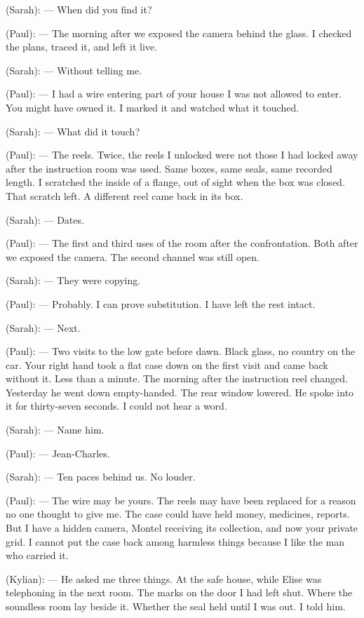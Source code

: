 \begin{room}
(Sarah): --- When did you find it?

(Paul): --- The morning after we exposed the camera behind the glass. I checked the plans, traced it, and left it live.

(Sarah): --- Without telling me.

(Paul): --- I had a wire entering part of your house I was not allowed to enter. You might have owned it. I marked it and watched what it touched.

(Sarah): --- What did it touch?

(Paul): --- The reels. Twice, the reels I unlocked were not those I had locked away after the instruction room was used. Same boxes, same seals, same recorded length. I scratched the inside of a flange, out of sight when the box was closed. That scratch left. A different reel came back in its box.

(Sarah): --- Dates.

(Paul): --- The first and third uses of the room after the confrontation. Both after we exposed the camera. The second channel was still open.

(Sarah): --- They were copying.

(Paul): --- Probably. I can prove substitution. I have left the rest intact.

(Sarah): --- Next.

(Paul): --- Two visits to the low gate before dawn. Black glass, no country on the car. Your right hand took a flat case down on the first visit and came back without it. Less than a minute. The morning after the instruction reel changed. Yesterday he went down empty-handed. The rear window lowered. He spoke into it for thirty-seven seconds. I could not hear a word.

(Sarah): --- Name him.

(Paul): --- Jean-Charles.

\centerline{}

(Sarah): --- Ten paces behind us. No louder.

(Paul): --- The wire may be yours. The reels may have been replaced for a reason no one thought to give me. The case could have held money, medicines, reports. But I have a hidden camera, Montel receiving its collection, and now your private grid. I cannot put the case back among harmless things because I like the man who carried it.

(Kylian): --- He asked me three things. At the safe house, while Elise was telephoning in the next room. The marks on the door I had left shut. Where the soundless room lay beside it. Whether the seal held until I was out. I told him.


\end{room}
